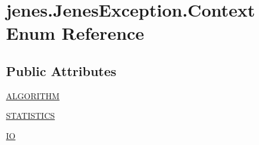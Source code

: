\hypertarget{enumjenes_1_1_jenes_exception_1_1_context}{\section{jenes.\-Jenes\-Exception.\-Context Enum Reference}
\label{enumjenes_1_1_jenes_exception_1_1_context}
}
\subsection*{Public Attributes}
\begin{DoxyCompactItemize}
\item 
\hyperlink{enumjenes_1_1_jenes_exception_1_1_context_ae925bab13906bd4450260c30cc7b4cab}{A\-L\-G\-O\-R\-I\-T\-H\-M}
\item 
\hyperlink{enumjenes_1_1_jenes_exception_1_1_context_ae0335a1dcf69b5493fac24c4c2c25cd1}{S\-T\-A\-T\-I\-S\-T\-I\-C\-S}
\item 
\hyperlink{enumjenes_1_1_jenes_exception_1_1_context_a023d03d781868c33bd25415d7c5602d0}{I\-O}
\end{DoxyCompactItemize}



